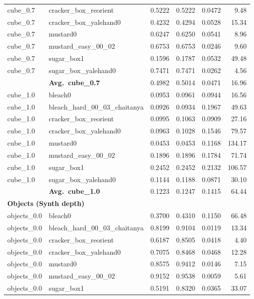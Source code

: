 \begin{longtable}{llrrrr}
  cube_0.7 & cracker\_box\_reorient & 0.5222 & 0.5222 & 0.0472 & 9.48 \\
  cube_0.7 & cracker\_box\_yalehand0 & 0.4232 & 0.4294 & 0.0528 & 15.34 \\
  cube_0.7 & mustard0 & 0.6247 & 0.6250 & 0.0541 & 8.96 \\
  cube_0.7 & mustard\_easy\_00\_02 & 0.6753 & 0.6753 & 0.0246 & 9.60 \\
  cube_0.7 & sugar\_box1 & 0.1596 & 0.1787 & 0.0532 & 49.48 \\
  cube_0.7 & sugar\_box\_yalehand0 & 0.7471 & 0.7471 & 0.0262 & 4.56 \\
  \cmidrule{2-6}
  & \textbf{Avg.~cube_0.7} & 0.4982 & 0.5014 & 0.0471 & 16.96 \\
  \midrule
  cube_1.0 & bleach0 & 0.0953 & 0.0961 & 0.0944 & 16.56 \\
  cube_1.0 & bleach\_hard\_00\_03\_chaitanya & 0.0926 & 0.0934 & 0.1967 & 49.63 \\
  cube_1.0 & cracker\_box\_reorient & 0.0995 & 0.1063 & 0.0909 & 27.16 \\
  cube_1.0 & cracker\_box\_yalehand0 & 0.0963 & 0.1028 & 0.1546 & 79.57 \\
  cube_1.0 & mustard0 & 0.0453 & 0.0453 & 0.1168 & 134.17 \\
  cube_1.0 & mustard\_easy\_00\_02 & 0.1896 & 0.1896 & 0.1784 & 71.74 \\
  cube_1.0 & sugar\_box1 & 0.2452 & 0.2452 & 0.2132 & 106.57 \\
  cube_1.0 & sugar\_box\_yalehand0 & 0.1144 & 0.1188 & 0.0871 & 30.10 \\
  \cmidrule{2-6}
  & \textbf{Avg.~cube_1.0} & 0.1223 & 0.1247 & 0.1415 & 64.44 \\
  \midrule
\multicolumn{6}{l}{\textbf{Objects (Synth depth)}} \\
\midrule
  objects_0.0 & bleach0 & 0.3700 & 0.4310 & 0.1150 & 66.48 \\
  objects_0.0 & bleach\_hard\_00\_03\_chaitanya & 0.8199 & 0.9104 & 0.0119 & 13.34 \\
  objects_0.0 & cracker\_box\_reorient & 0.6187 & 0.8505 & 0.0418 & 4.40 \\
  objects_0.0 & cracker\_box\_yalehand0 & 0.7075 & 0.8468 & 0.0468 & 12.28 \\
  objects_0.0 & mustard0 & 0.8575 & 0.9412 & 0.0146 & 7.15 \\
  objects_0.0 & mustard\_easy\_00\_02 & 0.9152 & 0.9538 & 0.0059 & 5.61 \\
  objects_0.0 & sugar\_box1 & 0.5191 & 0.8320 & 0.0365 & 33.07 \\

\end{longtable}
